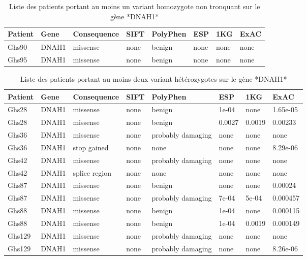 \documentclass[12pt,twoside]{reedthesis}
\theoremstyle{definition}
\theoremstyle{definition}
\theoremstyle{remark}
\begin{document}
  \begin{longtable}[t]{llllllll}
  \caption{\label{tab:unnamed-chunk-8}Liste des patients portant au moins un variant homozygote non tronquant sur le gène *DNAH1*}\\
  \toprule
  Patient & Gene & Consequence & SIFT & PolyPhen & ESP & 1KG & ExAC\\
  \midrule
  Ghs90 & DNAH1 & missense & none & benign & none & none & none\\
  Ghs95 & DNAH1 & missense & none & benign & none & none & none\\
  \bottomrule
  \end{longtable}
  
  \begin{longtable}[t]{llllllll}
  \caption{\label{tab:unnamed-chunk-9}Liste des patients portant au moins deux variant hétérozygotes sur le gène *DNAH1*}\\
  \toprule
  Patient & Gene & Consequence & SIFT & PolyPhen & ESP & 1KG & ExAC\\
  \midrule
  Ghs28 & DNAH1 & missense & none & benign & 1e-04 & none & 1.65e-05\\
  Ghs28 & DNAH1 & missense & none & benign & 0.0027 & 0.0019 & 0.00233\\
  Ghs36 & DNAH1 & missense & none & probably damaging & none & none & none\\
  Ghs36 & DNAH1 & stop gained & none & none & none & none & 8.29e-06\\
  Ghs42 & DNAH1 & missense & none & probably damaging & none & none & none\\
  \addlinespace
  Ghs42 & DNAH1 & splice region & none & none & none & none & none\\
  Ghs87 & DNAH1 & missense & none & benign & none & none & 0.00024\\
  Ghs87 & DNAH1 & missense & none & probably damaging & 7e-04 & 5e-04 & 0.000457\\
  Ghs88 & DNAH1 & missense & none & benign & 1e-04 & none & 0.000115\\
  Ghs88 & DNAH1 & missense & none & benign & 1e-04 & 0.0019 & 0.000149\\
  \addlinespace
  Ghs129 & DNAH1 & missense & none & probably damaging & none & none & none\\
  Ghs129 & DNAH1 & missense & none & probably damaging & none & none & 8.26e-06\\
  \bottomrule
  \end{longtable}
  
  \newpage
  
\end{document}
